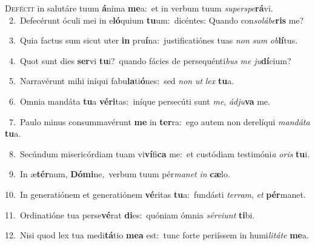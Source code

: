 \lettrine{\initial\textcolor{\initialcolor}{D}}{efécit} in salutáre tuum \textbf{á}\-nima \textbf{me}\-a:~\star et in verbum tuum \textit{su}\-\textit{per}\textit{spe}\textbf{rá}vi.\\
{\numbfont\textcolor{\numbcolor}{~2.}}~Defecérunt óculi mei in e\-\textbf{ló}\-quium \textbf{tu}\-um:~\star dicéntes: Quando con\-\textit{so}\-\textit{lá}\textit{be}\textbf{ris} me?\par
{\numbfont\textcolor{\numbcolor}{~3.}}~Quia factus sum sicut uter \textbf{in} pru\-\textbf{í}\-na:~\star justificatiónes tuas \textit{non} \textit{sum} \textit{ob}\-\textbf{lí}tus.\par
{\numbfont\textcolor{\numbcolor}{~4.}}~Quot sunt dies \textbf{ser}\-vi \textbf{tu}\-i?~\star quando fácies de persequénti\textit{bus} \textit{me} \textit{ju}\-\textbf{dí}cium?\par
{\numbfont\textcolor{\numbcolor}{~5.}}~Narravérunt mihi iníqui fabu\-\textbf{la}\-ti\-\textbf{ó}\-nes:~\star sed \textit{non} \textit{ut} \textit{lex} \textbf{tu}\-a.\par
{\numbfont\textcolor{\numbcolor}{~6.}}~Omnia mandáta \textbf{tu}\-a \textbf{vé}\-\textbf{ri}tas:~\star iníque persecúti sunt \textit{me}\-, \textit{ád}\-\textit{ju}\textbf{va} me.\par
{\numbfont\textcolor{\numbcolor}{~7.}}~Paulo minus consummavérunt \textbf{me} in \textbf{ter}\-ra:~\star ego autem non derelíqui \textit{man}\-\textit{dá}\textit{ta} \textbf{tu}\-a.\par
{\numbfont\textcolor{\numbcolor}{~8.}}~Secúndum misericórdiam tuam vi\-\textbf{ví}\-fi\textbf{ca} me:~\star et custódiam testimóni\textit{a} \textit{o}\-\textit{ris} \textbf{tu}\-i.\par
{\numbfont\textcolor{\numbcolor}{~9.}}~In æ\-\textbf{tér}\-num, \textbf{Dó}\-\textbf{mi}ne,~\star verbum tuum pér\-\textit{ma}\-\textit{net} \textit{in} \textbf{cæ}\-lo.\par
{\numbfont\textcolor{\numbcolor}{10.}}~In generatiónem et generatiónem \textbf{vé}\-ritas \textbf{tu}\-a:~\star fundásti \textit{ter}\-\textit{ram}, \textit{et} \textbf{pér}\-manet.\par
{\numbfont\textcolor{\numbcolor}{11.}}~Ordinatióne tua perse\-\textbf{vé}\-rat \textbf{di}\-es:~\star quóniam ómnia \textit{sér}\-\textit{vi}\textit{unt} \textbf{ti}\-bi.\par
{\numbfont\textcolor{\numbcolor}{12.}}~Nisi quod lex tua medi\-\textbf{tá}\-tio \textbf{me}\-\textbf{a} est:~\star tunc forte periíssem in humi\-\textit{li}\-\textit{tá}\textit{te} \textbf{me}\-a.\par
